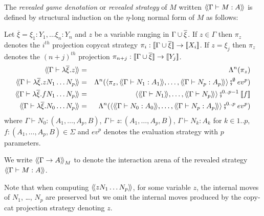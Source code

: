 \begin{dfn}
\label{dfn:interactionstrategy_ofterms}
The \emph{revealed game denotation} or \emph{revealed
strategy} of $M$ written ${\langle\!\langle \Gamma \vdash M : A \rangle\!\rangle}$ is defined by structural induction on the $\eta$-long normal form of $M$ as follows:

Let $\overline{\xi} = \xi_1 : Y_1, \ldots \xi_n : Y_n$
and $z$ be a variable ranging in $\Gamma \cup \overline{\xi}$. If $z\in \Gamma$ then $\pi_{z}$ denotes
the $i^{th}$ projection copycat strategy $\pi_i : {[\![ \Gamma \cup \overline{\xi} ]\!]} \rightarrow {[\![X_i ]\!]}$. If $z = \xi_j$ then
$\pi_{z}$ denotes the $(n+j)^{th}$ projection $\pi_{n+j} : {[\![ \Gamma \cup \overline{\xi} ]\!]} \rightarrow {[\![Y_j ]\!]}$.
\begin{eqnarray*}
\intersem{\Gamma \vdash \lambda \overline{\xi} . z } &=& \Lambda^n(\pi_{z})  \\
\intersem{\Gamma \vdash \lambda \overline{\xi} . z N_1 \ldots N_p} &=& \Lambda^n(\langle \pi_z, \intersem{\Gamma \vdash N_1 : A_1}, \ldots, \intersem{\Gamma \vdash N_p : A_p}  \rangle \fatsemi ^{\emptyset} ev^p) \\
\intersem{\Gamma \vdash \lambda \overline{\xi}. f N_1 \ldots N_p} &=& \langle \intersem{\Gamma \vdash N_1}, \ldots, \intersem{\Gamma \vdash N_p} \rangle \fatsemi^{0..p-1} \sem{f} \\
\intersem{\Gamma \vdash \lambda \overline{\xi} . N_0 \ldots N_p} &=& \Lambda^n(\langle \intersem{\Gamma \vdash N_0 : A_0}, \ldots, \intersem{\Gamma \vdash N_p : A_p}  \rangle \fatsemi^{0..p} ev^p)
\end{eqnarray*}
where $\Gamma \vdash N_0 : (A_1,\ldots,A_p,B)$, $\Gamma \vdash z : (A_1,\ldots,A_p,B)$, $\Gamma \vdash N_k : A_k$ for $k\in 1..p$,
$f : (A_1,\ldots,A_p,B) \in \Sigma$ and $ev^p$ denotes the evaluation strategy with $p$ parameters.

We write ${\langle\!\langle \Gamma \rightarrow A \rangle\!\rangle}_M$ to denote the
interaction arena of the revealed strategy ${\langle\!\langle \Gamma \vdash
M : A \rangle\!\rangle}$.
\end{dfn}
Note that when computing ${\langle\!\langle z N_1 \ldots N_p \rangle\!\rangle}$, for some variable $z$, the internal moves of $N_1$, \ldots, $N_p$ are preserved but
we omit the internal moves produced by the copy-cat projection strategy denoting $z$.



